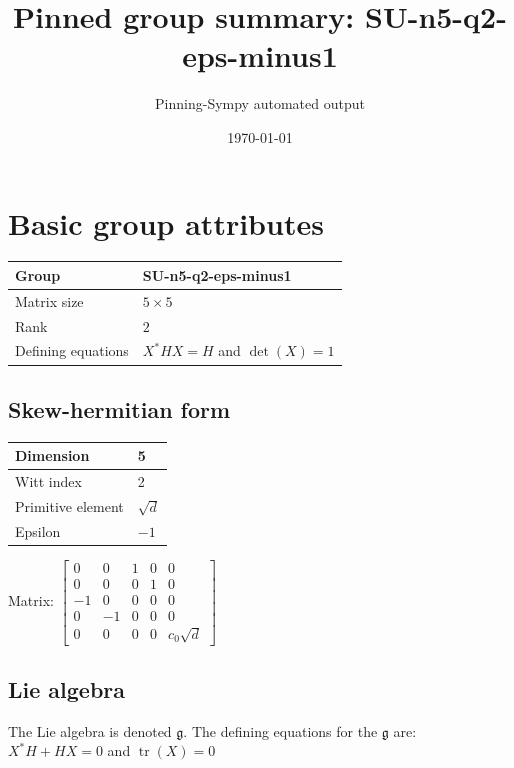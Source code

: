 \documentclass[11pt]{article}
\title{Pinned group summary: SU-n5-q2-eps-minus1}
\author{Pinning-Sympy automated output}
\date{\today}
\newcommand{\frakg}{\mathfrak{g}}
\theoremstyle{definition}
\begin{document}
\maketitle
\tableofcontents

\newpage

\section{Basic group attributes}

\def\arraystretch{1.2}
\begin{tabular}{|l|l|}
	\hline
    Group & SU-n5-q2-eps-minus1 \\
	\hline
    Matrix size & $5 \times 5$ \\
	\hline
    Rank & $2$ \\
	\hline
	Defining equations & $X^*HX=H$ and $\operatorname{det}(X)=1$ \\
	\hline
\end{tabular}
\def\arraystretch{1}

\subsection{Skew-hermitian form}
\begin{tabular}{|l|l|}
    \hline
    Dimension & 5 \\
    \hline
    Witt index & 2 \\
    \hline
    Primitive element & $\sqrt{d}$ \\
    \hline
    Epsilon & $-1$ \\
    \hline
\end{tabular}

\bigskip
\noindent Matrix: \(
\left[\begin{matrix}0 & 0 & 1 & 0 & 0\\0 & 0 & 0 & 1 & 0\\-1 & 0 & 0 & 0 & 0\\0 & -1 & 0 & 0 & 0\\0 & 0 & 0 & 0 & c_{0} \sqrt{d}\end{matrix}\right]
\)



\subsection{Lie algebra}

The Lie algebra is denoted $\frakg$. The defining equations for the $\frakg$ are: $X^*H + HX=0$ and $\operatorname{tr}(X)=0$
\end{document}
